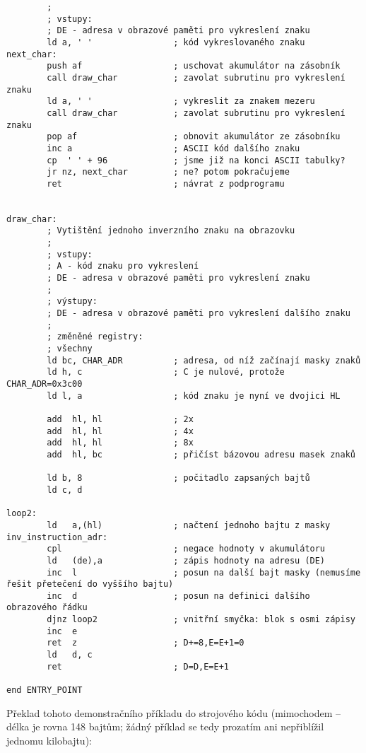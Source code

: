 \documentclass{article}
\begin{document}
\begin{verbatim}
        ;       
        ; vstupy:
        ; DE - adresa v obrazové paměti pro vykreslení znaku
        ld a, ' '                ; kód vykreslovaného znaku
next_char:
        push af                  ; uschovat akumulátor na zásobník
        call draw_char           ; zavolat subrutinu pro vykreslení znaku
        ld a, ' '                ; vykreslit za znakem mezeru
        call draw_char           ; zavolat subrutinu pro vykreslení znaku
        pop af                   ; obnovit akumulátor ze zásobníku
        inc a                    ; ASCII kód dalšího znaku
        cp  ' ' + 96             ; jsme již na konci ASCII tabulky?
        jr nz, next_char         ; ne? potom pokračujeme
        ret                      ; návrat z podprogramu
 
 
draw_char:
        ; Vytištění jednoho inverzního znaku na obrazovku
        ;
        ; vstupy:
        ; A - kód znaku pro vykreslení
        ; DE - adresa v obrazové paměti pro vykreslení znaku
        ;
        ; výstupy:
        ; DE - adresa v obrazové paměti pro vykreslení dalšího znaku
        ;
        ; změněné registry:
        ; všechny
        ld bc, CHAR_ADR          ; adresa, od níž začínají masky znaků
        ld h, c                  ; C je nulové, protože CHAR_ADR=0x3c00
        ld l, a                  ; kód znaku je nyní ve dvojici HL
 
        add  hl, hl              ; 2x
        add  hl, hl              ; 4x
        add  hl, hl              ; 8x
        add  hl, bc              ; přičíst bázovou adresu masek znaků
 
        ld b, 8                  ; počitadlo zapsaných bajtů
        ld c, d
 
loop2:
        ld   a,(hl)              ; načtení jednoho bajtu z masky
inv_instruction_adr:
        cpl                      ; negace hodnoty v akumulátoru
        ld   (de),a              ; zápis hodnoty na adresu (DE)
        inc  l                   ; posun na další bajt masky (nemusíme řešit přetečení do vyššího bajtu)
        inc  d                   ; posun na definici dalšího obrazového řádku
        djnz loop2               ; vnitřní smyčka: blok s osmi zápisy
        inc  e
        ret  z                   ; D+=8,E=E+1=0
        ld   d, c
        ret                      ; D=D,E=E+1
 
end ENTRY_POINT
\end{verbatim}

Překlad tohoto demonstračního příkladu do strojového kódu (mimochodem --
délka je rovna 148 bajtům; žádný příklad se tedy prozatím ani
nepřiblížil jednomu kilobajtu):
\end{document}
